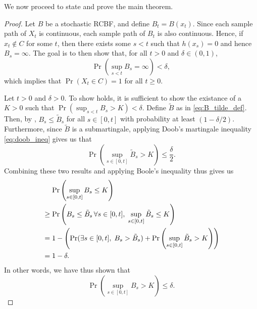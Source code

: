 \documentclass[twocolumn,amsthm]{autart}
\DeclareMathOperator{\interior}{int}
\begin{document}
We now proceed to state and prove the main theorem.
\begin{proof}
    Let $B$ be a stochastic RCBF, and define $B_t = B(x_t)$.
    Since each sample path of $X_t$ is continuous, each sample path of $B_t$ is also continuous.
    Hence, if $x_t \not \in C$ for some $t$, then there exists some $s < t$ such that $h(x_s ) = 0$ and hence $B_s = \infty$. The goal is to then show that, for all $t > 0$ and $\delta \in (0, 1)$,
    \begin{equation} \label{eq:p_B_infty_delta}
        \Pr(\sup_{s < t} B_s = \infty) < \delta,
    \end{equation}
    which implies that $\Pr(X_t \in C) = 1$ for all $t\geq 0$.

    Let $t>0$ and $\delta >0$. To show  holds, it is sufficient to show the existance of a $K > 0$ such that $\Pr(\sup_{s < t} B_s > K) < \delta$. Define $\tilde{B}$ as in \eqref{eq:B_tilde_def}.
    Then, by , $B_s \leq \tilde{B}_s$ for all $s\in[0,t]$ with probability at least $(1 - \delta/2)$.
    Furthermore, since $\tilde{B}$ is a submartingale, applying Doob's martingale inequality \eqref{eq:doob_ineq} gives us that
    \begin{equation}
        \Pr\left( \sup_{s \in [0, t]} \tilde{B}_s > K \right) \leq \frac{\delta}{2}.
    \end{equation}
    Combining these two results and applying Boole's inequality thus gives us
    \begin{align}
        &\mathrel{\phantom{=}} \Pr\left(\sup_{s \in [0, t]} B_s \leq K \right) \notag\\
        &\geq \Pr\left( B_s \leq \tilde{B}_s\, \forall s \in [0, t],\; \sup_{s \in [0,t]} \tilde{B}_s \leq K \right) \\
        &= 1 - \left( \Pr(\exists s \in [0, t],\; B_s > \tilde{B}_s) + \Pr\left(\sup_{s \in [0, t]} \tilde{B}_s > K \right) \right) \\
        &= 1 - \delta.
    \end{align}
    In other words, we have thus shown that
    \begin{equation}
        \Pr\left( \sup_{s \in [0, t]} B_s > K \right) \leq \delta.
    \end{equation}
\end{proof}
\end{document}

